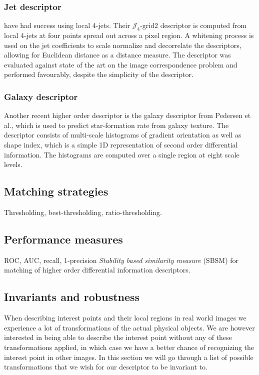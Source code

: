 \documentclass[thesis.tex]{subfiles}
\begin{document}
\subsubsection{Jet descriptor}

\cite{larsen2012jet} have had success using local 4-jets. Their
$\mathcal{J}_4$-grid2 descriptor is computed from local 4-jets at four points
spread out across a pixel region. A whitening process is used on the jet
coefficients to scale normalize and decorrelate the descriptors, allowing for
Euclidean distance as a distance measure. The descriptor was evaluated against
state of the art on the image correspondence problem and performed favourably,
despite the simplicity of the descriptor.

\subsubsection{Galaxy descriptor}

Another recent higher order descriptor is the galaxy descriptor from Pedersen
et al.\cite{pedersen2013shape}, which is used to predict star-formation
rate from galaxy texture. The descriptor consists of multi-scale histograms
of gradient orientation as well as shape index, which is a simple 1D
representation of second order differential information. The histograms are
computed over a single region at eight scale levels.

\subsection{Matching strategies}
\label{sec:matching_strategies}

Thresholding, best-thresholding, ratio-thresholding.

\subsection{Performance measures}
\label{sec:performance_measures}

ROC, AUC, recall, 1-precision
\emph{Stability based similarity measure} (SBSM) \cite{balmashnova2008novel} for matching of higher order differential information descriptors.


\subsection{Invariants and robustness}
When describing interest points and their local regions in real world images we experience a lot of transformations of the actual physical objects. We are however interested in being able to describe the interest point without any of these transformations applied, in which case we have a better chance of recognizing the interest point in other images. In this section we will go through a list of possible transformations that we wish for our descriptor to be invariant to.
\end{document}
